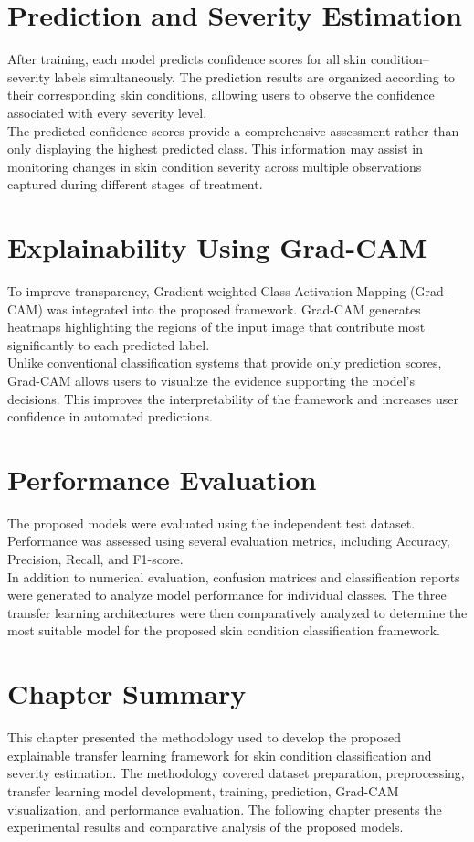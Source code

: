 \section{Prediction and Severity Estimation}
After training, each model predicts confidence scores for all skin condition–severity labels simultaneously. The prediction results are organized according to their corresponding skin conditions, allowing users to observe the confidence associated with every severity level.\\
The predicted confidence scores provide a comprehensive assessment rather than only displaying the highest predicted class. This information may assist in monitoring changes in skin condition severity across multiple observations captured during different stages of treatment.

\section{Explainability Using Grad-CAM}
To improve transparency, Gradient-weighted Class Activation Mapping (Grad-CAM) was integrated into the proposed framework. Grad-CAM generates heatmaps highlighting the regions of the input image that contribute most significantly to each predicted label.\\
Unlike conventional classification systems that provide only prediction scores, Grad-CAM allows users to visualize the evidence supporting the model's decisions. This improves the interpretability of the framework and increases user confidence in automated predictions.

\section{Performance Evaluation}
The proposed models were evaluated using the independent test dataset. Performance was assessed using several evaluation metrics, including Accuracy, Precision, Recall, and F1-score.\\
In addition to numerical evaluation, confusion matrices and classification reports were generated to analyze model performance for individual classes. The three transfer learning architectures were then comparatively analyzed to determine the most suitable model for the proposed skin condition classification framework.

\section{Chapter Summary}
This chapter presented the methodology used to develop the proposed explainable transfer learning framework for skin condition classification and severity estimation. The methodology covered dataset preparation, preprocessing, transfer learning model development, training, prediction, Grad-CAM visualization, and performance evaluation. The following chapter presents the experimental results and comparative analysis of the proposed models.
